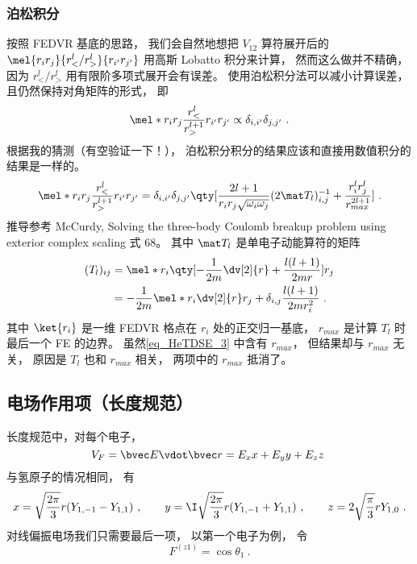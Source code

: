 \subsubsection{泊松积分}
按照 FEDVR 基底的思路， 我们会自然地想把 $V_{12}$ 算符展开后的 $\mel{r_i r_j}{r_<^l/r_>^l}{r_{i'} r_{j'}}$ 用高斯 Lobatto 积分来计算， 然而这么做并不精确， 因为 $r_<^l/r_>^l$ 用有限阶多项式展开会有误差。 使用泊松积分法可以减小计算误差， 且仍然保持对角矩阵的形式， 即
\begin{equation}
\mel*{r_i r_j}{\frac{r_<^l}{r_>^{l+1}}}{r_{i'} r_{j'}} \propto \delta_{i,i'} \delta_{j,j'}~.
\end{equation}
根据我的猜测（有空验证一下！）， 泊松积分积分的结果应该和直接用数值积分的结果是一样的。
\begin{equation}\label{eq_HeTDSE_3}
\mel*{r_i r_j}{\frac{r_<^l}{r_>^{l+1}}}{r_{i'} r_{j'}} = \delta_{i,i'} \delta_{j,j'} \qty[\frac{2l+1}{r_i r_j \sqrt{\omega_i \omega_j}} (2\mat T_l)^{-1}_{i,j} + \frac{r_i^l r_j^l}{r_{max}^{2l+1}}]~.
\end{equation}
推导参考 McCurdy, Solving the three-body Coulomb breakup problem using exterior complex scaling 式 68。 其中 $\mat T_l$ 是单电子动能算符的矩阵
\begin{equation}
\begin{aligned}
(T_l)_{ij} &= \mel*{r_i}{\qty[-\frac{1}{2m}\dv[2]{r} + \frac{l(l+1)}{2mr}]}{r_j}\\
&= -\frac{1}{2m} \mel*{r_i}{\dv[2]{r}}{r_j} + \delta_{i,j}\frac{l(l+1)}{2mr_i^2}~.
\end{aligned}
\end{equation}
其中 $\ket{r_i}$ 是一维 FEDVR 格点在 $r_i$ 处的正交归一基底， $r_{max}$ 是计算 $T_l$ 时最后一个 FE 的边界。 虽然\autoref{eq_HeTDSE_3} 中含有 $r_{max}$， 但结果却与 $r_{max}$ 无关， 原因是 $T_l$ 也和 $r_{max}$ 相关， 两项中的 $r_{max}$ 抵消了。

\subsection{电场作用项（长度规范）}
长度规范中，对每个电子，
\begin{equation}\label{eq_HeTDSE_12}
V_F = \bvec E \vdot \bvec r = E_x x + E_y y + E_z z~
\end{equation}
与氢原子的情况相同， 有
\begin{equation}
x = \sqrt{\frac{2\pi}{3}} r (Y_{1,-1} - Y_{1,1})~, \qquad
y = \I \sqrt{\frac{2\pi}{3}} r (Y_{1,-1}+Y_{1,1}) ~,\qquad
z =2\sqrt{\frac{\pi}{3}} rY_{1,0}~.
\end{equation}
对线偏振电场我们只需要最后一项， 以第一个电子为例， 令
\begin{equation}\label{eq_HeTDSE_20}
F^{(z1)} = \cos\theta_1~.
\end{equation}

